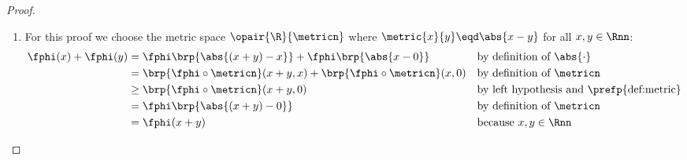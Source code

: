 \begin{proof}
\begin{enumerate}
\begin{enumerate}
      \item For this proof we choose the metric space $\opair{\R}{\metricn}$ where $\metric{x}{y}\eqd\abs{x-y}$ for all $x,y\in\Rnn$:
        \begin{align*}
          \fphi(x) + \fphi(y)
            &=   \fphi\brp{\abs{(x+y)-x}} + \fphi\brp{\abs{x-0}} 
            &&   \text{by definition of $\abs{\cdot}$}
          \\&=   \brp{\fphi\circ\metricn}(x+y,x) + \brp{\fphi\circ\metricn}(x,0)
            &&   \text{by definition of $\metricn$}
          \\&\ge \brp{\fphi\circ\metricn}(x+y,0)
            &&   \text{by left hypothesis and \prefp{def:metric}}
          \\&=   \fphi\brp{\abs{(x+y)-0}}
            &&   \text{by definition of $\metricn$}
          \\&=   \fphi(x+y)
            &&   \text{because $x,y\in\Rnn$}
        \end{align*}
    \end{enumerate}
\end{enumerate}
\end{proof}

